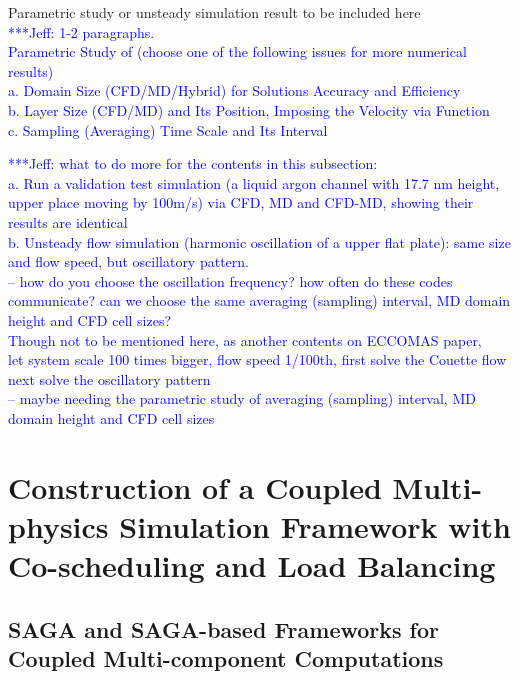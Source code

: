 \documentclass[conference,final]{IEEEtran}
\newcommand{\skonote}[1]{ {\textcolor{blue} { ***Jeff: #1 }}}
\newcommand{\skonote}[1]{}
\begin{document}
Parametric study or unsteady simulation result to be included here\\
\skonote{1-2 paragraphs.\\
Parametric Study of (choose one of the following issues for more numerical results)\\
a. Domain Size (CFD/MD/Hybrid) for Solutions Accuracy and Efficiency\\
b. Layer Size (CFD/MD) and Its Position, Imposing the Velocity via Function\\
c. Sampling (Averaging) Time Scale and Its Interval}
\newline
\newline


\skonote{what to do more for the contents in this subsection:\\
a. Run a validation test simulation (a liquid argon channel with 17.7 nm height, upper place moving by 100m/s) via CFD, MD and CFD-MD, showing their results are identical\\
b. Unsteady flow simulation (harmonic oscillation of a upper flat plate): same size and flow speed, but oscillatory pattern.\\
-- how do you choose the oscillation frequency? how often do these codes communicate? can we choose the same averaging (sampling) interval, MD domain height and CFD cell sizes? \\
Though not to be mentioned here, as another contents on ECCOMAS paper,\\
let system scale 100 times bigger, flow speed 1/100th, first solve the Couette flow\\
next solve the oscillatory pattern\\
-- maybe needing the parametric study of averaging (sampling) interval, MD domain height and CFD cell sizes}


\section{Construction of a Coupled Multi-physics Simulation Framework with Co-scheduling and Load Balancing}
\subsection{SAGA and SAGA-based Frameworks for Coupled Multi-component Computations}
\end{document}
